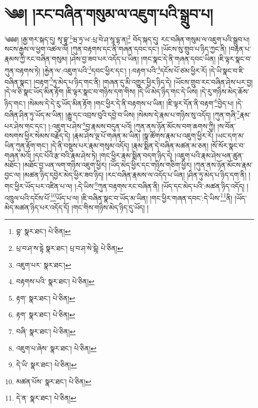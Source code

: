 \setcounter{footnote}{0} 
\chapter{༄༅། །རང་བཞིན་གསུམ་ལ་འཇུག་པའི་སྒྲུབ་པ།}༄༅༅། །རྒྱ་གར་སྐད་དུ། སྭ་བྷཱ་\footnote{བྷ་  སྣར་ཐང་།  པེ་ཅིན། }ཝ་ཏྲ་ཡ་:པྲ་བེ་ཤ་སཱ་དྷ་ན།\footnote{པྲ་བ་ཤ་ས་དྷེ  སྣར་ཐང་། པྲ་བ་ཤ་སེ་ངྷེ།  པེ་ཅིན། } བོད་སྐད་དུ། རང་བཞིན་གསུམ་ལ་འཇུག་པའི་སྒྲུབ་པ། སངས་རྒྱས་ལ་ཕྱག་འཚལ་ལོ། །ཀུན་བརྟགས་དང་ནི་གཞན་དབང་དང་། །ཡོངས་སུ་གྲུབ་པ་ཉིད་ཀྱང་ནི། །བརྟན་པ་རྣམས་ཀྱི་རང་བཞིན་གསུམ། །ཤེས་བྱ་ཟབ་པར་འདོད་པ་ཡིན། །གང་སྣང་དེ་ནི་གཞན་དབང་ཡིན། །ཇི་ལྟར་སྣང་བ་ཀུན་བརྟགས་ཏེ། །རྐྱེན་ལ་:འཇུག་པའི་\footnote{འཇུག་པར་  སྣར་ཐང་། }དབང་ཕྱིར་དང་། །:བརྟག་པའི་\footnote{བརྟགས་པའི་  སྣར་ཐང་།  པེ་ཅིན། }དངོས་པོ་ཙམ་ཕྱིར་རོ། །དེ་ཡི་སྣང་བ་ཇི་བཞིན་སྣང་། །བརྟག་\footnote{རྟག་  སྣར་ཐང་།  པེ་ཅིན། }ཏུ་མེད་པ་ཉིད་གང་ནི། །གཞན་དུ་མི་འགྱུར་ཕྱིར་ཉིད་དེ། །ཡོངས་གྲུབ་རང་བཞིན་ཤེས་པར་བྱ། །དེ་ལ་ཅི་སྣང་ཡོད་མིན་རྟོག །ཇི་ལྟར་སྣང་བ་གཉིས་དག་གིས། །དེ་ཡི་མེད་ཉིད་གང་དེ་ཡིས། །དེ་རུ་གཉིས་མེད་ཆོས་ཉིད་གང་། །སེམས་དེ་དེ་རུ་ཡོད་མིན་རྟོག །གང་ཕྱིར་དེ་ནི་བརྟགས་པ་ཡིན། །ཇི་ལྟར་དོན་ནི་བརྟག་\footnote{རྟག་  སྣར་ཐང་།  པེ་ཅིན། }བྱེད་པ། །དེ་བཞིན་ཤིན་ཏུ་ཡོད་མ་ཡིན། །རྒྱུ་དང་འབྲས་བུའི་དབྱེ་བ་ཡིས། །སེམས་དེ་རྣམ་པ་གཉིས་སུ་འདོད། །ཀུན་གཞི་\footnote{བཞི་  སྣར་ཐང་།  པེ་ཅིན། }རྣམ་པར་ཤེས་གང་དང་། །:འཇུག་པ་ཤེས་\footnote{འཇུག་པ་ཞེས་  སྣར་ཐང་།  པེ་ཅིན། }བྱ་རྣམས་བདུན་པའོ། །ཀུན་ནས་ཉོན་མོངས་བག་ཆགས་ཀྱི། །ས་བོན་བསགས་ཕྱིར་སེམས་བརྗོད་དེ། །རྣམ་ཤེས་ལྔ་པོ་གཞན་མ་ཡིན། །སྣ་ཚོགས་རྣམ་པ་འཇུག་ཕྱིར་རོ། །ཡང་དག་མ་ཡིན་ཀུན་རྟོག་གང་། །དེ་ནི་བསྡུས་པར་རྣམ་གསུམ་འདོད། །རྣམ་སྨིན་དེ་བཞིན་མཚན་མ་ཅན། །སོ་སོར་སྣང་བ་གཞན་མའོ། །དང་པོའི་རྩ་བའི་རྣམ་ཤེས་ཏེ། །གང་ཕྱིར་རྣམ་སྨིན་བདག་ཉིད་དེ། །འཇུག་པའི་རྣམ་ཤེས་ཕན་ཚུན་མཐོང་། །མཐོང་བྱ་ཡན་ལག་གཉིས་འཇུག་ཕྱིར། །ཡོད་མེད་ཕྱིར་དང་གཉིས་གཅིག་ཕྱིར། །ཀུན་ནས་ཉོན་མོངས་རྣམ་བྱང་ལ། །མཚན་ཉིད་དབྱེར་མེད་ཕྱིར་ཟབ་ཉིད། །རང་བཞིན་རྣམས་ལ་འདོད་པ་ཡིན། །ཤིན་ཏུ་མེད་པ་ཉིད་དག་ནི། །གང་ཕྱིར་ཡོད་པར་འཛིན་པ་ལ། །:དེ་ཡིས་\footnote{དེ་ཡི་  སྣར་ཐང་།  པེ་ཅིན། }ཀུན་བརྟགས་རང་བཞིན་ནི། །ཡོད་དང་མེད་པའི་:མཚན་ཉིད་འདོད། །འཁྲུལ་པའི་དངོས་པོ་\footnote{མཚན་པོས་  སྣར་ཐང་།  པེ་ཅིན། }ཡོད་པ་ལ། །ཇི་བཞིན་སྣང་བ་ཡོད་མ་ཡིན། །གང་ཕྱིར་གཞན་དབང་:དེ་ཡིས་\footnote{དེ་ན་  སྣར་ཐང་།  པེ་ཅིན། }ནི། །ཡོད་མེད་མཚན་ཉིད་པར་འདོད་དོ། །གང་གིས་གཉིས་མེད་ཉིད་དུ་ཡོད། །
